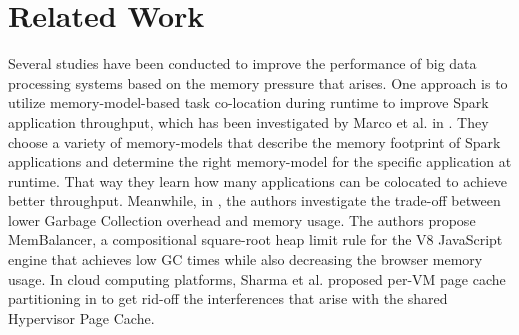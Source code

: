 \section{Related Work}


Several studies have been conducted to improve the performance of big
data processing systems based on the memory pressure that arises. One approach is to utilize memory-model-based task
co-location during runtime to improve Spark application throughput, which has been
investigated by Marco et al. in \cite{Colocation}. They choose a variety of memory-models
that describe the memory footprint of Spark applications and determine the right memory-model
for the specific application at runtime. That way they learn how many applications can be colocated
to achieve better throughput.
Meanwhile, in \cite{Limits}, the authors investigate the trade-off between lower Garbage Collection overhead and memory usage. The authors propose MemBalancer, a compositional square-root heap limit rule for the
V8 JavaScript engine that achieves low GC times while also decreasing the browser memory usage.
In cloud computing platforms, Sharma
et al. proposed per-VM page cache partitioning in \cite{PC} 
to get rid-off the interferences that arise with the shared Hypervisor Page Cache.
\iffalse
\note{jk: is this related of what we
are doing? Maybe yes but you need to provide more context}. Additionally, Bhimani et al. proposed
a lightweight virtualization framework for accelerating big data
applications on enterprise cloud in [10], while Zhang et al. focused
on understanding and improving disk-based intermediate data caching in
Spark in [11]. Finally, Intasorn et al. investigated using compression
tables to improve HiveQL performance with Spark in a case study on
NVMe storage devices in [12]. 

\note{I thin this paragraph does not help. It sounds like the previous
study make a big effort and provide analysis. So, I guess, why do I
need to read this paper? What is the new that I will learn. Can we
show the open research questions/problems that the previous studies do
not target?}
These studies demonstrate a variety of approaches for optimizing big
data processing systems, ranging from memory-aware task co-location
and memory offloading to scheduler design and virtualization
frameworks. The findings from these studies can provide insights and
guidance for future research in the field of big data processing.
\fi
